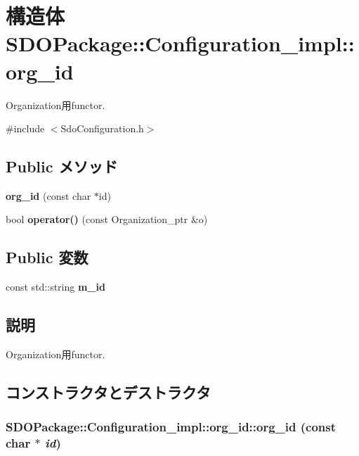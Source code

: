 \section{構造体 SDOPackage::Configuration\_\-impl::org\_\-id}
\label{structSDOPackage_1_1Configuration__impl_1_1org__id}


Organization用functor.  




{\ttfamily \#include $<$SdoConfiguration.h$>$}

\subsection*{Public メソッド}
\begin{DoxyCompactItemize}
\item 
{\bf org\_\-id} (const char $\ast$id)
\item 
bool {\bf operator()} (const Organization\_\-ptr \&o)
\end{DoxyCompactItemize}
\subsection*{Public 変数}
\begin{DoxyCompactItemize}
\item 
const std::string {\bf m\_\-id}
\end{DoxyCompactItemize}


\subsection{説明}
Organization用functor. 

\subsection{コンストラクタとデストラクタ}
\subsubsection[{org\_\-id}]{\setlength{\rightskip}{0pt plus 5cm}SDOPackage::Configuration\_\-impl::org\_\-id::org\_\-id (const char $\ast$ {\em id})\hspace{0.3cm}{\ttfamily  [inline]}}\label{structSDOPackage_1_1Configuration__impl_1_1org__id_a1aff6392a1613e8a5a858c744be87559}


